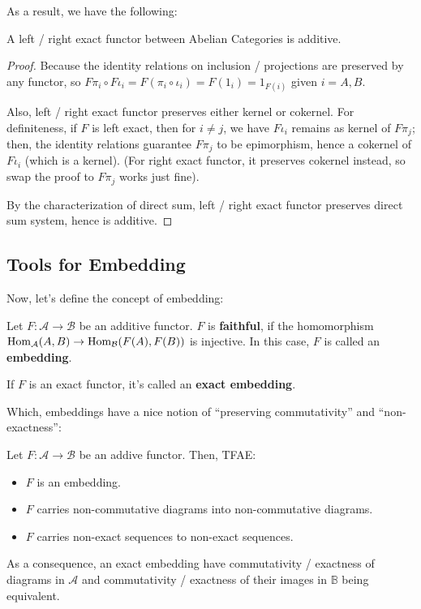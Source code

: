 \documentclass{article}
\begin{document}
As a result, we have the following:
\begin{cor}
    A left / right exact functor between Abelian Categories is additive.
\end{cor}
\begin{proof}
    Because the identity relations on inclusion / projections are preserved by any functor, so $F \pi_i\circ F\iota_i = F(\pi_i\circ \iota_i)=F(1_i)=1_{F(i)}$ given $i=A,B$.
    
    Also, left / right exact functor preserves either kernel or cokernel. For definiteness, if $F$ is left exact, then for $i\neq j$, we have $F\iota_i$ remains as kernel of $F\pi_j$; then, the identity relations guarantee $F\pi_j$ to be epimorphism, hence a cokernel of $F\iota_i$ (which is a kernel). (For right exact functor, it preserves cokernel instead, so swap the proof to $F\pi_j$ works just fine).

    By the characterization of direct sum, left / right exact functor preserves direct sum system, hence is additive.
\end{proof}

\newpage

\subsection{Tools for Embedding}

Now, let's define the concept of embedding:
\begin{defn}
    Let $F:\mathcal{A}\rightarrow\mathcal{B}$ be an additive functor. $F$ is \textbf{faithful}, if the homomorphism $\mathrm{Hom}_\mathcal{A}(A,B)\rightarrow\mathrm{Hom}_\mathcal{B}(F(A),F(B))$ is injective. In this case, $F$ is called an \textbf{embedding}.

    If $F$ is an exact functor, it's called an \textbf{exact embedding}.
\end{defn}

Which, embeddings have a nice notion of ``preserving commutativity'' and ``non-exactness'':
\begin{prop}
    Let $F:\mathcal{A}\rightarrow\mathcal{B}$ be an addive functor. Then, TFAE:
    \begin{itemize}
        \item[(a)] $F$ is an embedding.
        \item[(b)] $F$ carries non-commutative diagrams into non-commutative diagrams.
        \item[(c)] $F$ carries non-exact sequences to non-exact sequences.  
    \end{itemize}
\end{prop}
As a consequence, an exact embedding have commutativity / exactness of diagrams in $\mathcal{A}$ and commutativity / exactness of their images in $\mathbb{B}$ being equivalent.
\end{document}
